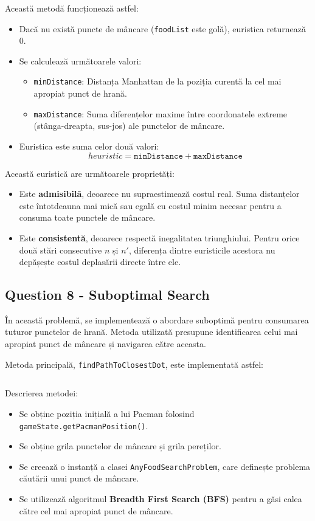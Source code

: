 \par Această metodă funcționează astfel:
\begin{itemize}
	\item Dacă nu există puncte de mâncare (\texttt{foodList} este golă), euristica returnează 0.
	\item Se calculează următoarele valori:
	\begin{itemize}
		\item \texttt{minDistance}: Distanța Manhattan de la poziția curentă la cel mai apropiat punct de hrană.
		\item \texttt{maxDistance}: Suma diferențelor maxime între coordonatele extreme (stânga-dreapta, sus-jos) ale punctelor de mâncare.
	\end{itemize}
	\item Euristica este suma celor două valori:
	\[
	heuristic = \texttt{minDistance} + \texttt{maxDistance}
	\]
\end{itemize}

\par Această euristică are următoarele proprietăți:
\begin{itemize}
	\item Este \textbf{admisibilă}, deoarece nu supraestimează costul real. Suma distanțelor este întotdeauna mai mică sau egală cu costul minim necesar pentru a consuma toate punctele de mâncare.
	\item Este \textbf{consistentă}, deoarece respectă inegalitatea triunghiului. Pentru orice două stări consecutive \( n \) și \( n' \), diferența dintre euristicile acestora nu depășește costul deplasării directe între ele.
\end{itemize}

\subsection{Question 8 - Suboptimal Search}
\par În această problemă, se implementează o abordare suboptimă pentru consumarea tuturor punctelor de hrană. Metoda utilizată presupune identificarea celui mai apropiat punct de mâncare și navigarea către aceasta.

\par Metoda principală, \texttt{findPathToClosestDot}, este implementată astfel:
\inputminted[linenos]{python}{code/suboptimal_search.py}

\par Descrierea metodei:
\begin{itemize}
	\item Se obține poziția inițială a lui Pacman folosind \texttt{gameState.getPacmanPosition()}.
	\item Se obține grila punctelor de mâncare și grila pereților.
	\item Se creează o instanță a clasei \texttt{AnyFoodSearchProblem}, care definește problema căutării unui punct de mâncare.
	\item Se utilizează algoritmul \textbf{Breadth First Search (BFS)} pentru a găsi calea către cel mai apropiat punct de mâncare.
\end{itemize}

